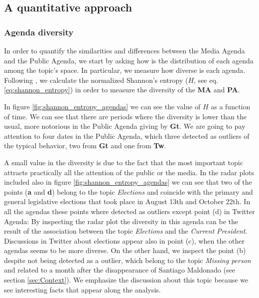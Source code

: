 \subsection{A quantitative approach}

\subsubsection{Agenda diversity}


\par In order to quantify the similarities and differences between the Media Agenda and the Public Agenda, we start by asking how is the distribution of each agenda among the topic's space. In particular, we measure how diverse is each agenda. Following \cite{boydstun2014importance}, we calculate the normalized Shannon's entropy ($H$, see eq.\ref{eq:shannon_entropy}) in order to measure the diversity of the \textbf{MA} and \textbf{PA}.
\par In figure \ref{fig:shannon_entropy_agendas} we can see the value of $H$ as a function of time. We can see that there are periods where the diversity is lower than the usual, more notorious in the Public Agenda giving by \textbf{Gt}. 
We are going to pay attention to four dates in the Public Agenda, which three detected as outliers of the typical behavior, two from \textbf{Gt} and one from \textbf{Tw}. 
\par A small value in the diversity is due to the fact that the most important topic attracts practically all the attention of the public or the media.
In the radar plots included also in figure \ref{fig:shannon_entropy_agendas} we can see that two of the points (\textbf{a} and \textbf{d}) belong to the topic \emph{Elections} and coincide with the primary and general legislative elections that took place in August 13th and October 22th. 
In all the agendas these points where detected as outliers except point (d) in Twitter Agenda: By inspecting the radar plot the diversity in this agenda can be the result of the association between the topic \emph{Elections} and the \emph{Current President}.
Discussions in Twitter about elections appear also in point (c), when the other agendas seems to be more diverse. 
On the other hand, we inspect the point (b) despite not being detected as a outlier, which belong to the topic \emph{Missing person} and related to a month after the disappearance of Santiago Maldonado (see section \ref{sec:Context}). 
We emphasize the discussion about this topic because we see interesting facts that appear along the analysis.

